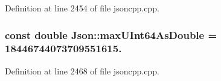 Definition at line 2454 of file jsoncpp.\+cpp.

\subsubsection[{\texorpdfstring{max\+U\+Int64\+As\+Double}{maxUInt64AsDouble}}]{\setlength{\rightskip}{0pt plus 5cm}const double Json\+::max\+U\+Int64\+As\+Double = 18446744073709551615.\hspace{0.3cm}{\ttfamily [static]}}\hypertarget{namespace_json_aecc0306aa526f25c5156f842182fb7fb}{}\label{namespace_json_aecc0306aa526f25c5156f842182fb7fb}


Definition at line 2468 of file jsoncpp.\+cpp.

